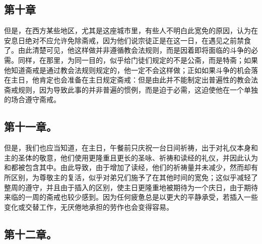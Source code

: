 
\subsection{第十章}

\par

但是，在西方某些地区，尤其是这座城市里，有些人不明白此宽免的原因，认为在安息日绝对不应允许免除斋戒，因为他们说宗徒正是在这一日，在遇见之前禁食了。由此清楚可见，他这样做并非遵循教会法规则，而是因着即将面临的斗争的必需。同样，在那里，为同一目的，似乎给门徒们规定的不是公斋，而是特斋；如果他知道斋戒是通过教会法规则规定的，他一定不会这样做；正如如果斗争的机会落在主日，他肯定也会准备在主日规定斋戒：但是由此并不能制定出普遍性的教会法斋戒规则，因为导致此事的并非普遍的惯例，而是迫于必需，这迫使他在一个单独的场合遵守斋戒。\par


\subsection{第十一章。}

\par

但是，我们也应当知道，在主日，午餐前只庆祝一台日间祈祷，出于对礼仪本身和主的圣体的敬意，他们使用更隆重且更长的圣咏、祈祷和读经的礼仪，并因此认为和都被包含其中。由此导致，由于增加了读经，他们的祈祷量并未减少，然而却有所区别，为尊敬主的复活，似乎对弟兄们施予了在其他时间的宽免；这似乎减轻了整周的遵守，并且由于插入的区别，使主日更隆重地被期待为一个庆日，由于期待来临的一周的斋戒也较少感到。因为任何疲惫总是以更大的平静承受，若插入一些变化或交替工作，无厌倦地承担的劳作也会变得容易。\par


\subsection{第十二章。}

\par

